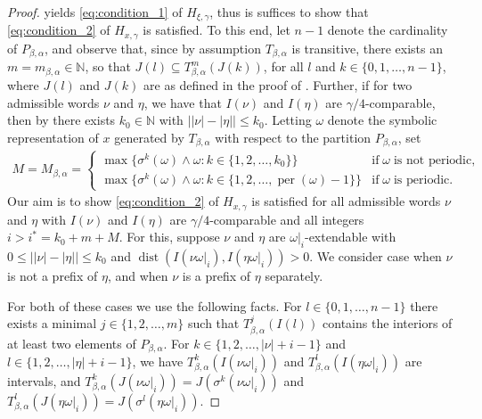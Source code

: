 \documentclass[10pt,a4paper]{amsart}
\begin{document}
\begin{proof}
 yields \eqref{eq:condition_1} of $H_{\xi, \gamma}$, thus is suffices to show that \eqref{eq:condition_2} of $H_{x, \gamma}$ is satisfied.  To this end, let $n-1$ denote the cardinality of $P_{\beta,\alpha}$, and observe that, since by assumption $T_{\beta, \alpha}$ is transitive, there exists an $m = m_{\beta, \alpha} \in \mathbb{N}$, so that $J(l) \subseteq T_{\beta,\alpha}^{m}(J(k))$, for all $l$ and $k \in \{0, 1, \ldots, n-1\}$, where $J(l)$ and $J(k)$ are as defined in the proof of .  Further, if for two admissible words $\nu$ and $\eta$, we have that $I(\nu)$ and $I(\eta)$ are $\gamma/4$-comparable, then by  there exists $k_{0} \in \mathbb{N}$ with $\lvert \lvert \nu \rvert - \lvert \eta \rvert \rvert \leq k_{0}$.  Letting $\omega$ denote the symbolic representation of $x$ generated by $T_{\beta, \alpha}$ with respect to the partition $P_{\beta,\alpha}$, set
    \begin{align*}
        M = M_{\beta, \alpha} = \begin{cases}
        \max \{ \sigma^{k}(\omega) \wedge \omega \colon k \in \{1, 2, \ldots, k_{0} \}\} & \text{if} \; \omega \; \text{is not periodic},\\
        \max \{ \sigma^{k}(\omega) \wedge \omega \colon k \in \{1, 2, \ldots, \operatorname{per}(\omega) -1 \}\} & \text{if} \; \omega \; \text{is periodic.}
        \end{cases}
    \end{align*}
Our aim is to show \eqref{eq:condition_2} of $H_{x, \gamma}$ is satisfied for all admissible words $\nu$ and $\eta$ with $I(\nu)$ and $I(\eta)$ are $\gamma/4$-comparable and all integers $i > i^{*} = k_{0} + m + M$. For this, suppose $\nu$ and $\eta$ are $\omega\vert_{i}$-extendable with $0 \leq \lvert \lvert \nu \rvert - \lvert \eta \rvert \rvert \leq k_{0}$ and $\operatorname{dist}(I(\nu\omega\vert_{i}), I(\eta\omega\vert_{i})) > 0$.  We consider case when $\nu$ is not a prefix of $\eta$, and when $\nu$ is a prefix of $\eta$ separately.

For both of these cases we use the following facts. For $l \in \{ 0, 1, \ldots, n-1\}$ there exists a minimal $j \in \{ 1, 2, \ldots, m \}$ such that $T_{\beta, \alpha}^{j}(I(l))$ contains the interiors of at least two elements of $P_{\beta,\alpha}$.  For $k \in \{1, 2, \ldots, \lvert \nu \rvert + i -1\}$ and $l \in \{1, 2, \ldots, \lvert \eta \rvert + i -1\}$, we have $T_{\beta, \alpha}^{k}(I(\nu \omega\vert_{i}))$ and $T_{\beta, \alpha}^{l}(I(\eta \omega\vert_{i}))$ are intervals, and $T_{\beta, \alpha}^{k}(J(\nu \omega\vert_{i})) = J(\sigma^{k}(\nu \omega\vert_{i}))$ and $T_{\beta, \alpha}^{l}(J(\eta \omega\vert_{i})) = J(\sigma^{l}(\eta \omega\vert_{i}))$.


\end{proof}
\end{document}
